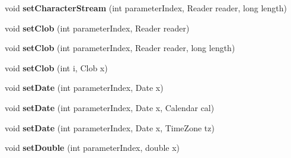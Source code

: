\begin{DoxyCompactItemize}
\mbox{\label{classcom_1_1mysql_1_1cj_1_1_client_prepared_query_bindings_a160c280bbfedeead1a672b68d245d613}} 
void {\bfseries set\+Character\+Stream} (int parameter\+Index, Reader reader, long length)
\item 
\mbox{\label{classcom_1_1mysql_1_1cj_1_1_client_prepared_query_bindings_ae8fb9950a17fdd878c66249b20116274}} 
void {\bfseries set\+Clob} (int parameter\+Index, Reader reader)
\item 
\mbox{\label{classcom_1_1mysql_1_1cj_1_1_client_prepared_query_bindings_a6e800ec3969550fb71ef9dd45f6b5b96}} 
void {\bfseries set\+Clob} (int parameter\+Index, Reader reader, long length)
\item 
\mbox{\label{classcom_1_1mysql_1_1cj_1_1_client_prepared_query_bindings_a532773875726ace451dd1bd52d91e704}} 
void {\bfseries set\+Clob} (int i, Clob x)
\item 
\mbox{\label{classcom_1_1mysql_1_1cj_1_1_client_prepared_query_bindings_ac826ab952eb411c43caed01901b4efe9}} 
void {\bfseries set\+Date} (int parameter\+Index, Date x)
\item 
\mbox{\label{classcom_1_1mysql_1_1cj_1_1_client_prepared_query_bindings_a1a09b9abf41ef4cc9140772f830054ca}} 
void {\bfseries set\+Date} (int parameter\+Index, Date x, Calendar cal)
\item 
\mbox{\label{classcom_1_1mysql_1_1cj_1_1_client_prepared_query_bindings_a6418fd43826b99ca4c7ea197e9225484}} 
void {\bfseries set\+Date} (int parameter\+Index, Date x, Time\+Zone tz)
\item 
\mbox{\label{classcom_1_1mysql_1_1cj_1_1_client_prepared_query_bindings_ad8aebf5446194678a8119590116e8c03}} 
void {\bfseries set\+Double} (int parameter\+Index, double x)
\item 

\end{DoxyCompactItemize}
